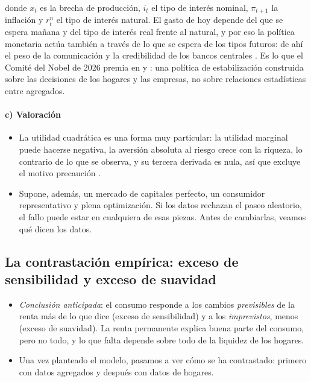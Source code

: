 \documentclass[11pt]{article}
\begin{document}
\begin{itemize}
\begin{equation*}
  \end{equation*}
  donde $x_t$ es la brecha de producción, $i_t$ el tipo de interés nominal, $\pi_{t+1}$ la inflación y $r^n_t$ el tipo de interés natural. El gasto de hoy depende del que se espera mañana y del tipo de interés real frente al natural, y por eso la política monetaria actúa también a través de lo que se espera de los tipos futuros: de ahí el peso de la comunicación y la credibilidad de los bancos centrales . Es lo que el Comité del Nobel de 2026 premia en  y : una política de estabilización construida sobre las decisiones de los hogares y las empresas, no sobre relaciones estadísticas entre agregados\nocite{Nobel2026Cientifico}.
\end{itemize}

\paragraph{c) Valoración}

\begin{itemize}
\item La utilidad cuadrática es una forma muy particular: la utilidad marginal puede hacerse negativa, la aversión absoluta al riesgo crece con la riqueza, lo contrario de lo que se observa, y su tercera derivada es nula, así que excluye el motivo precaución .
\item Supone, además, un mercado de capitales perfecto, un consumidor representativo y plena optimización. Si los datos rechazan el paseo aleatorio, el fallo puede estar en cualquiera de esas piezas. Antes de cambiarlas, veamos qué dicen los datos.
\end{itemize}

\subsection{La contrastación empírica: exceso de sensibilidad y exceso de suavidad}\label{sec:contrastacion}

\begin{itemize}
\item \emph{Conclusión anticipada}: el consumo responde a los cambios \emph{previsibles} de la renta más de lo que dice  (exceso de sensibilidad) y a los \emph{imprevistos}, menos (exceso de suavidad). La renta permanente explica buena parte del consumo, pero no todo, y lo que falta depende sobre todo de la liquidez de los hogares.
\item Una vez planteado el modelo, pasamos a ver cómo se ha contrastado: primero con datos agregados y después con datos de hogares.
\end{itemize}
\end{document}
